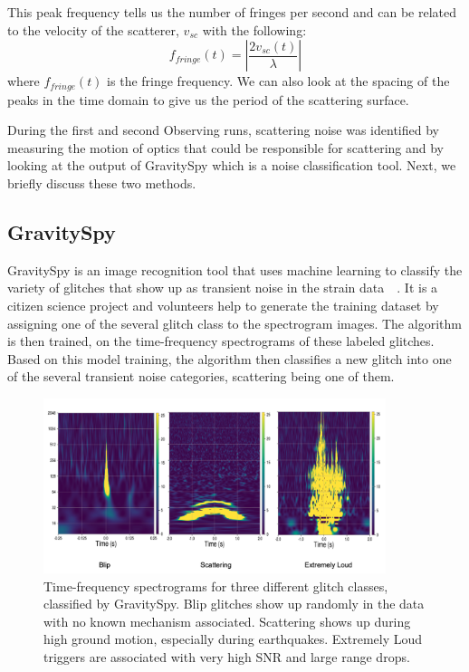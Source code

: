 \documentclass[12pt]{iopart}
\begin{document}
This peak frequency tells us the number of fringes per second and can be related to the velocity of the scatterer, $v_{sc}$ with the following:
\begin{equation}
    f_{fringe}(t) = \left|\frac{2v_{sc}(t)}{\lambda}\right|  \label{eq:3}
\end{equation}
where $f_{fringe}(t)$ is the fringe frequency. We can also look at the spacing of the peaks in the time domain to give us the period of the scattering surface.

During the first and second Observing runs, scattering noise was identified by measuring the motion of optics that could be responsible for scattering and by looking at the output of GravitySpy which is a noise classification tool. Next, we briefly discuss these two methods.


\subsection{GravitySpy}
GravitySpy is an image recognition tool that uses machine learning to classify the variety of glitches that show up as transient noise in the strain data~\cite{gspy}~\cite{gspymachine}. It is a citizen science project and volunteers help to generate the training dataset by assigning one of the several glitch class to the spectrogram images. The algorithm is then trained, on the time-frequency spectrograms of these labeled glitches. Based on this model training, the algorithm then classifies a new glitch into one of the several transient noise categories, scattering being one of them.

\begin{figure}[h]
    \centering
    \includegraphics[width=10cm]{gspyglitch1.png}
    \caption{Time-frequency spectrograms for three different glitch classes, classified by GravitySpy. Blip glitches show up randomly in the data with no known mechanism associated. Scattering shows up during high ground motion, especially during earthquakes. Extremely Loud triggers are associated with very high SNR and large range drops. }
    \label{fig:gspyimages}
\end{figure}
\end{document}
